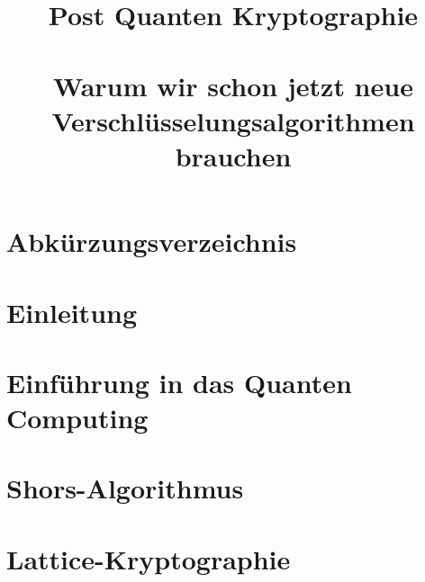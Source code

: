 \documentclass[conference]{IEEEtran}
\begin{document}

\title{Post Quanten Kryptographie\\
\large \ \\ \large Warum wir schon jetzt neue Verschlüsselungsalgorithmen brauchen}

\author{

  \and

}

\maketitle



\listoffigures
{}

\section*{Abkürzungsverzeichnis}


\section{Einleitung}


\section{Einführung in das Quanten Computing}


% 

\section{Shors-Algorithmus}


\section{Lattice-Kryptographie}

\end{document}
